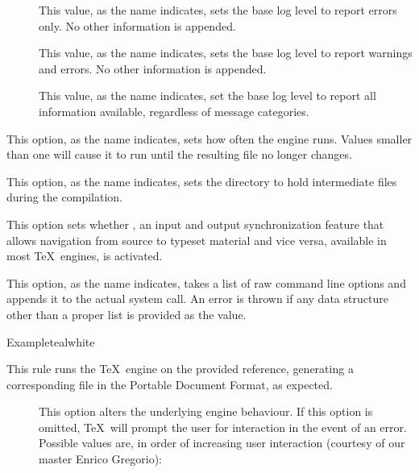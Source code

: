 \begin{description}
\begin{description}
\begin{description}
\item[] This value, as the name indicates, sets the base log level to report errors only. No other information is appended.

\item[] This value, as the name indicates, sets the base log level to report warnings and errors. No other information is appended.

\item[] This value, as the name indicates, set the base log level to report all information available, regardless of message categories.
\end{description}

\item[\abox{frequency}] This option, as the name indicates, sets how often the engine runs. Values smaller than one will cause it to run until the resulting file no longer changes.

\item[\abox{directory}] This option, as the name indicates, sets the directory to hold intermediate files during the compilation.

\item[\rpsbox{synctex}] This option sets whether , an input and output synchronization feature that allows navigation from source to typeset material and vice versa, available in most \TeX\ engines, is activated.

\item[\abox{options}] This option, as the name indicates, takes a list of raw command line options and appends it to the actual system call. An error is thrown if any data structure other than a proper list is provided as the value.
\end{description}

\begin{codebox}{Example}{teal}{\icnote}{white}
\end{codebox}

\item[\rulebox{luahbtex}]
This rule runs the  \TeX\ engine on the provided  reference, generating a corresponding file in the Portable Document Format, as expected.

\begin{description}
\item[] This option alters the underlying engine behaviour. If this option is omitted, \TeX\ will prompt the user for interaction in the event of an error. Possible values are, in order of increasing user interaction (courtesy of our master Enrico Gregorio):


\end{description}
\end{description}
